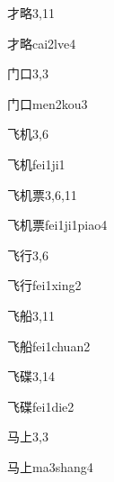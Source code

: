 \begin{entry}{才略}{3,11}
  \begin{phonetics}{才略}{cai2lve4}
  \end{phonetics}
\end{entry}

\begin{entry}{门口}{3,3}
  \begin{phonetics}{门口}{men2kou3}
  \end{phonetics}
\end{entry}

\begin{entry}{飞机}{3,6}
  \begin{phonetics}{飞机}{fei1ji1}
  \end{phonetics}
\end{entry}

\begin{entry}{飞机票}{3,6,11}
  \begin{phonetics}{飞机票}{fei1ji1piao4}
  \end{phonetics}
\end{entry}

\begin{entry}{飞行}{3,6}
  \begin{phonetics}{飞行}{fei1xing2}
  \end{phonetics}
\end{entry}

\begin{entry}{飞船}{3,11}
  \begin{phonetics}{飞船}{fei1chuan2}
  \end{phonetics}
\end{entry}

\begin{entry}{飞碟}{3,14}
  \begin{phonetics}{飞碟}{fei1die2}
  \end{phonetics}
\end{entry}

\begin{entry}{马上}{3,3}
  \begin{phonetics}{马上}{ma3shang4}
  \end{phonetics}
\end{entry}

